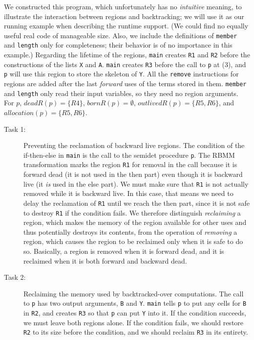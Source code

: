 \documentclass{tlp}
\newcommand{\bornR}[1]{\ensuremath{{bornR}(#1)}}
\newcommand{\deadR}[1]{\ensuremath{{deadR}(#1)}}
\newcommand{\outlivedR}[1]{\ensuremath{{outlivedR}(#1)}}
\newcommand{\allocation}[1]{\ensuremath{{allocation}(#1)}}
\newcommand{\code}[1]{{\tt#1}}
\begin{document}
We constructed this program,
which unfortunately has no \emph{intuitive} meaning,
to illustrate the interaction between regions and backtracking;
we will use it as our running example when describing the runtime support.
(We could find no equally useful real code of manageable size.
Also, we include the definitions of \code{member} and \code{length}
only for completeness;
their behavior is of no importance in this example.)
Regarding the lifetime of the regions,
\code{main} creates \code{R1} and \code{R2}
before the constructions of the lists \code{X} and \code{A}.
\code{main} creates \code{R3} before the call to \code{p} at (3),
and \code{p} will use this region to store the skeleton of \code{Y}.
All the \code{remove} instructions for regions are added
after the last \emph{forward} uses of the terms stored in them.
\code{member} and \code{length} only read their input variables,
so they need no region arguments.
For $p$, $\deadR{p} = \{R4\}$, $\bornR{p} = \emptyset$,
$\outlivedR{p} = \{R5, R6\}$, and $\allocation{p} = \{R5, R6\}$.

\begin{description}
\item[Task 1:]
    Preventing the reclamation of backward live regions.
    The condition of the if-then-else in \code{main}
    is the call to the semidet procedure \code{p}.
    The RBMM transformation marks the region \code{R1} for removal in the call
    because it is forward dead (it is not used in the then part)
    even though it is backward live (it \emph{is} used in the else part).
    We must make sure that \code{R1} is not actually removed
    while it is backward live.
    In this case, that means we need to delay
    the reclamation of \code{R1} until we reach the then part,
    since it is not safe to destroy \code{R1} if the condition fails.
    We therefore distinguish \emph{reclaiming} a region,
    which makes the memory of the region available for other uses
    and thus potentially destroys its contents,
    from the operation of \emph{removing} a region,
    which causes the region to be reclaimed only when it is safe to do so.
    Basically, a region is removed when it is forward dead,
    and it is reclaimed when it is both forward and backward dead.

\item[Task 2:]
    Reclaiming the memory used by backtracked-over computations.
    The call to \code{p} has two output arguments, \code{B} and \code{Y}.
    \code{main} tells \code{p} to put any cells for \code{B} in \code{R2},
    and creates \code{R3} so that \code{p} can put \code{Y} into it.
    If the condition succeeds, we must leave both regions alone.
    If the condition fails,
    we should restore \code{R2} to its size before the condition,
    and we should reclaim \code{R3} in its entirety.
\end{description}
\end{document}
